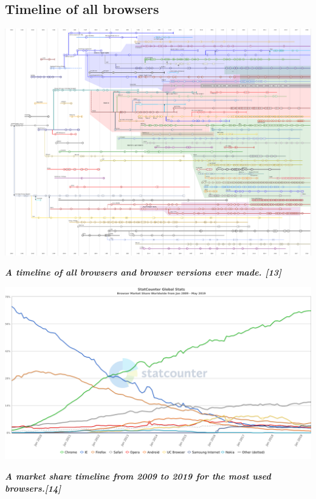 \documentclass[runningheads]{llncs}
\begin{document}
		\subsection{Timeline of all browsers}	\includegraphics[scale=0.7]{TimelineOfWebBrowsers.png}
			\begin{center}
				\textit{\textbf{A timeline of all browsers and browser versions ever made. [13]}}\\
			\end{center}

		\includegraphics[scale=0.31]{WebBrowserMarketShare.png}
		\begin{center}
			\textit{\textbf{A market share timeline from 2009 to 2019 for the most used browsers.[14]}}
		\end{center}
\end{document}
